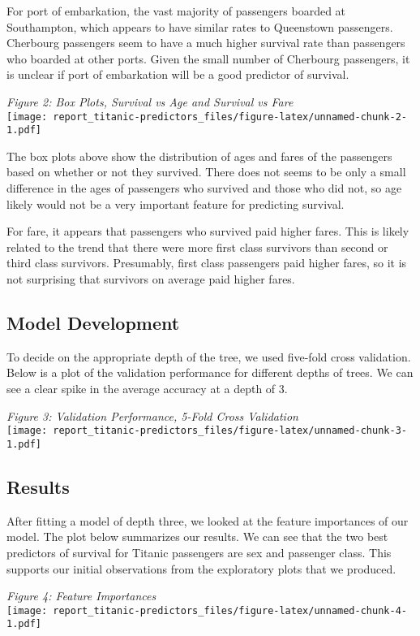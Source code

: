 \documentclass[]{article}
\begin{document}
For port of embarkation, the vast majority of passengers boarded at
Southampton, which appears to have similar rates to Queenstown
passengers. Cherbourg passengers seem to have a much higher survival
rate than passengers who boarded at other ports. Given the small number
of Cherbourg passengers, it is unclear if port of embarkation will be a
good predictor of survival.

\emph{Figure 2: Box Plots, Survival vs Age and Survival vs Fare}\\
\texttt{[image: report\_titanic-predictors\_files/figure-latex/unnamed-chunk-2-1.pdf]}

The box plots above show the distribution of ages and fares of the
passengers based on whether or not they survived. There does not seems
to be only a small difference in the ages of passengers who survived and
those who did not, so age likely would not be a very important feature
for predicting survival.

For fare, it appears that passengers who survived paid higher fares.
This is likely related to the trend that there were more first class
survivors than second or third class survivors. Presumably, first class
passengers paid higher fares, so it is not surprising that survivors on
average paid higher fares.

\subsection{Model Development}\label{model-development}

To decide on the appropriate depth of the tree, we used five-fold cross
validation. Below is a plot of the validation performance for different
depths of trees. We can see a clear spike in the average accuracy at a
depth of 3.

\emph{Figure 3: Validation Performance, 5-Fold Cross Validation}\\
\texttt{[image: report\_titanic-predictors\_files/figure-latex/unnamed-chunk-3-1.pdf]}

\subsection{Results}\label{results}

After fitting a model of depth three, we looked at the feature
importances of our model. The plot below summarizes our results. We can
see that the two best predictors of survival for Titanic passengers are
sex and passenger class. This supports our initial observations from the
exploratory plots that we produced.

\emph{Figure 4: Feature Importances}\\
\texttt{[image: report\_titanic-predictors\_files/figure-latex/unnamed-chunk-4-1.pdf]}
\end{document}
